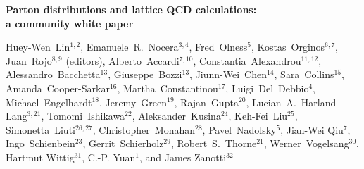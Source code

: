 \documentclass[twoside,12pt]{article}
\numberwithin{equation}{section}
\numberwithin{figure}{section}
\numberwithin{table}{section}
\begin{document}
\vspace{.3cm}

\begin{center}
{\Large \bf Parton distributions and lattice QCD calculations:
\\[0.2cm] a community white paper}
\vspace{.4cm}

{\small 
  Huey-Wen~Lin$^{1,2}$,
  Emanuele~R.~Nocera$^{3,4}$,
  Fred~Olness$^5$,
  Kostas~Orginos$^{6,7}$,
  Juan~Rojo$^{8,9}$ (editors),
  Alberto~Accardi$^{7,10}$, 
  Constantia~Alexandrou$^{11,12}$, 
  Alessandro~Bacchetta$^{13}$, 
  Giuseppe~Bozzi$^{13}$, 
  Jiunn-Wei~Chen$^{14}$,
  Sara~Collins$^{15}$, 	
  Amanda~Cooper-Sarkar$^{16}$,
  Martha~Constantinou$^{17}$, 
  Luigi~Del~Debbio$^{4}$, 
  Michael~Engelhardt$^{18}$, 
  Jeremy~Green$^{19}$, 
  Rajan~Gupta$^{20}$, 
  Lucian~A.~Harland-Lang$^{3,21}$, 
  Tomomi~Ishikawa$^{22}$, 
  Aleksander~Kusina$^{24}$, 
  Keh-Fei~Liu$^{25}$, 	
  Simonetta~Liuti$^{26,27}$, 		
  Christopher~Monahan$^{28}$, 		
  Pavel~Nadolsky$^{5}$,
  Jian-Wei Qiu$^{7}$,
  Ingo~Schienbein$^{23}$, 	
  Gerrit~Schierholz$^{29}$,
  Robert~S.~Thorne$^{21}$,
  Werner~Vogelsang$^{30}$,\\
  Hartmut Wittig$^{31}$, 
  C.-P. Yuan$^{1}$, and
  James Zanotti$^{32}$
}


\end{center}
\end{document}
